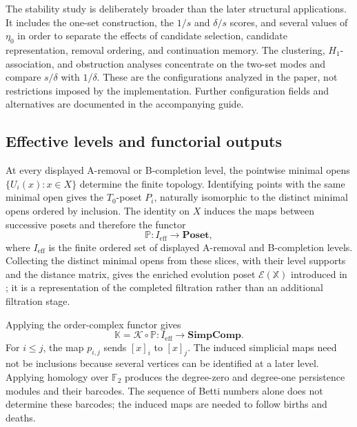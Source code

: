 \documentclass[a4paper,11pt]{article}
\theoremstyle{definition}
\theoremstyle{remark}
\begin{document}
The stability study is deliberately broader than the later structural applications. It includes the one-set construction, the $1/s$ and $\delta/s$ scores, and several values of $\eta_0$ in order to separate the effects of candidate selection, candidate representation, removal ordering, and continuation memory. The clustering, $H_1$-association, and obstruction analyses concentrate on the two-set modes and compare $s/\delta$ with $1/\delta$. These are the configurations analyzed in the paper, not restrictions imposed by the implementation. Further configuration fields and alternatives are documented in the accompanying guide.



\subsection{Effective levels and functorial outputs}
\label{subsec:poset-and-evolution}

At every displayed A-removal or B-completion level, the pointwise minimal opens $\{U_i(x)\colon x\in X\}$ determine the finite topology. Identifying points with the same minimal open gives the $T_0$-poset $P_i$, naturally isomorphic to the distinct minimal opens ordered by inclusion. The identity on $X$ induces the maps between successive posets and therefore the functor
$$
\mathbb P\colon I_{\mathrm{eff}}\longrightarrow\mathbf{Poset},
$$
where $I_{\mathrm{eff}}$ is the finite ordered set of displayed A-removal and B-completion levels. Collecting the distinct minimal opens from these slices, with their level supports and the distance matrix, gives the enriched evolution poset $\mathcal E(\mathbb X)$ introduced in ; it is a representation of the completed filtration rather than an additional filtration stage.

Applying the order-complex functor gives
$$
\mathbb K=\mathcal K\circ\mathbb P\colon I_{\mathrm{eff}}\longrightarrow\mathbf{SimpComp}.
$$
For $i\leq j$, the map $p_{i,j}$ sends $[x]_i$ to $[x]_j$. The induced simplicial maps need not be inclusions because several vertices can be identified at a later level. Applying homology over $\mathbb F_2$ produces the degree-zero and degree-one persistence modules and their barcodes. The sequence of Betti numbers alone does not determine these barcodes; the induced maps are needed to follow births and deaths.
\end{document}
